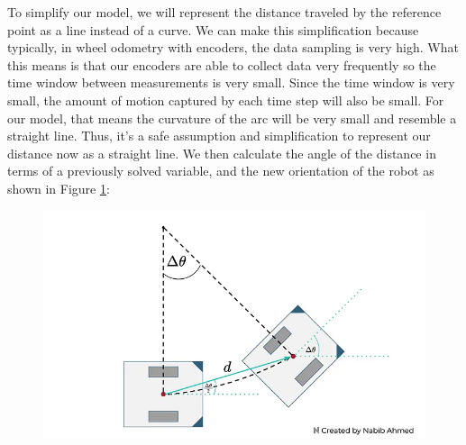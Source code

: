 To simplify our model, we will represent the distance traveled by the reference point as a line instead of a curve.
We can make this simplification because typically, in wheel odometry with encoders, the data sampling is very high. What this means is that our encoders are able to collect data very frequently so the time window between measurements is very small. Since the time window is very small, the amount of motion captured by each time step will also be small. For our model, that means the curvature of the arc will be very small and resemble a straight line. Thus, it’s a safe assumption and simplification to represent our distance now as a straight line. We then calculate the angle of the distance in terms of a previously solved variable, and the new orientation of the robot as shown in Figure \ref{fig:alphabeta}:
\begin{figure}[H]
	\centering
	\includegraphics[width=0.8\linewidth]{figures/alpha beta.png}
	\caption{}
	\label{fig:alphabeta}
\end{figure}

